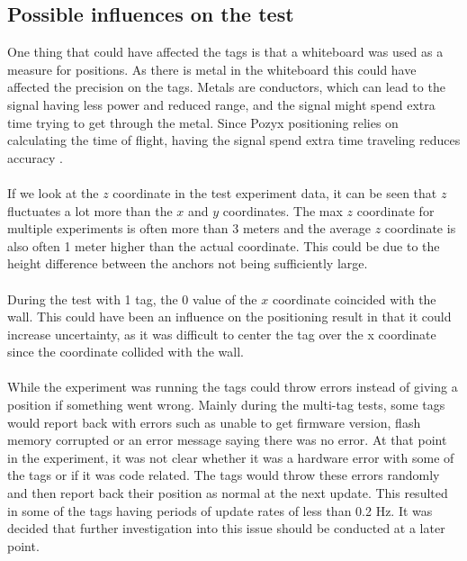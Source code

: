 \subsection{Possible influences on the test}
One thing that could have affected the tags is that a whiteboard was used as a measure for positions. 
As there is metal in the whiteboard this could have affected the precision on the tags.
Metals are conductors, which can lead to the signal having less power and reduced range, and the signal might spend extra time trying to get through the metal.
Since Pozyx positioning relies on calculating the time of flight, having the signal spend extra time traveling reduces accuracy \cite{pozyx-UWBObstacles}. 
\\\\
If we look at the  $z$ coordinate in the test experiment data, it can be seen that $z$ fluctuates a lot more than the $x$ and $y$ coordinates. 
The max $z$ coordinate for multiple experiments is often more than 3 meters and the average $z$ coordinate is also often 1 meter higher than the actual coordinate.
This could be due to the height difference between the anchors not being sufficiently large.
\\\\
During the test with 1 tag, the 0 value of the $x$ coordinate coincided with the wall. 
This could have been an influence on the positioning result in that it could increase uncertainty, as it was difficult to center the tag over the x coordinate since the coordinate collided with the wall.
\\\\
While the experiment was running the tags could throw errors instead of giving a position if something went wrong.
Mainly during the multi-tag tests, some tags would report back with errors such as unable to get firmware version, flash memory corrupted or an error message saying there was no error.
At that point in the experiment, it was not clear whether it was a hardware error with some of the tags or if it was code related.
The tags would throw these errors randomly and then report back their position as normal at the next update.
This resulted in some of the tags having periods of update rates of less than 0.2 Hz.
It was decided that further investigation into this issue should be conducted at a later point.

